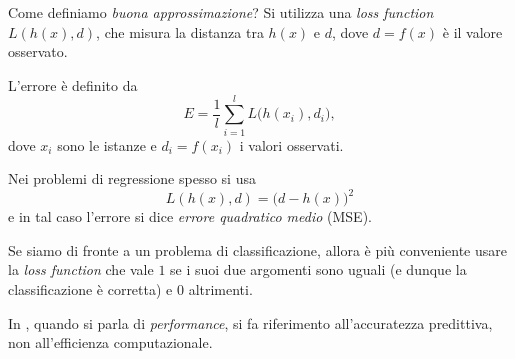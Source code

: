 Come definiamo \emph{buona approssimazione}? Si utilizza una \emph{loss function} $L(h(x),d)$, che misura la distanza tra $h(x)$ e $d$, dove $d=f(x)$ è il valore osservato.

\begin{definition}[Errore]
L'errore è definito da
\begin{equation}
E=\frac 1l\sum_{i=1}^{l}L\big(h(x_i),d_i\big),
\end{equation}
dove $x_i$ sono le istanze e $d_i=f(x_i)$ i valori osservati.
\end{definition}

\begin{example}
Nei problemi di regressione spesso si usa \[L(h(x),d)=\big(d-h(x)\big)^2\]e in tal caso l'errore si dice \emph{errore quadratico medio} (MSE).

Se siamo di fronte a un problema di classificazione, allora è più conveniente usare la \emph{loss function} che vale $1$ se i suoi due argomenti sono uguali (e dunque la classificazione è corretta) e $0$ altrimenti.
\end{example}

\begin{remark}
In \ml, quando si parla di \emph{performance}, si fa riferimento all'accuratezza predittiva, non all'efficienza computazionale.
\end{remark}